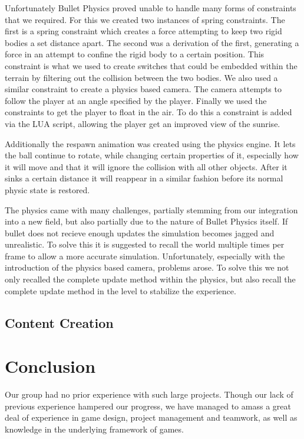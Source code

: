 \documentclass[sponsored]{acmsiggraph}
\begin{document}
Unfortunately Bullet Physics proved unable to handle many forms of constraints that we required. For this we created two instances of spring constraints. The first is a spring constraint which creates a force attempting to keep two rigid bodies a set distance apart. The second was a derivation of the first, generating a force in an attempt to confine the rigid body to a certain position. This constraint is what we used to create switches that could be embedded within the terrain by filtering out the collision between the two bodies.
We also used a similar constraint to create a physics based camera. The camera attempts to follow the player at an angle specified by the player. Finally we used the constraints to get the player to float in the air. To do this a constraint is added via the LUA script, allowing the player get an improved view of the sunrise.

Additionally the respawn animation was created using the physics engine. It lets the ball continue to rotate, while changing certain properties of it, especially how it will move and that it will ignore the collision with all other objects. After it sinks a certain distance it will reappear in a similar fashion before its normal physic state is restored.

The physics came with many challenges, partially stemming from our integration into a new field, but also partially due to the nature of Bullet Physics itself. If bullet does not recieve enough updates the simulation becomes jagged and unrealistic. To solve this it is suggested to recall the world multiple times per frame to allow a more accurate simulation. Unfortunately, especially with the introduction of the physics based camera, problems arose. To solve this we not only recalled the complete update method within the physics, but also recall the complete update method in the level to stabilize the experience.

\subsection{Content Creation}

\section{Conclusion}

Our group had no prior experience with such large projects. Though our lack of previous experience hampered our progress, we have managed to amass a great deal of experience in game design, project management and teamwork, as well as knowledge in the underlying framework of games.
\end{document}
